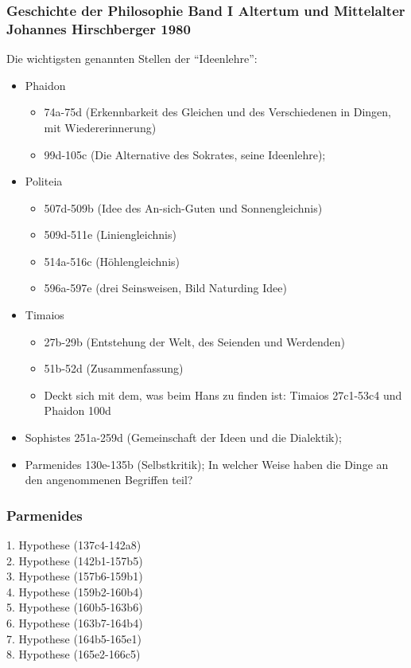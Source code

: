 \subsubsection*{Geschichte der Philosophie Band I Altertum und Mittelalter Johannes Hirschberger 1980}
Die wichtigsten genannten Stellen der \enquote{Ideenlehre}:
\begin{itemize}
    \item {Phaidon
    \begin{itemize}
        \item{74a-75d (Erkennbarkeit des Gleichen und des Verschiedenen in Dingen, mit Wiedererinnerung)}
        \item{99d-105c (Die Alternative des Sokrates, seine Ideenlehre);}
    \end{itemize}}
    \item{Politeia
        \begin{itemize}
            \item{507d-509b (Idee des An-sich-Guten und Sonnengleichnis)}
            \item{509d-511e (Liniengleichnis)}
            \item{514a-516c (Höhlengleichnis)}
            \item{596a-597e (drei Seinsweisen, Bild Naturding Idee)}
        \end{itemize}}
    \item{Timaios
    \begin{itemize}
        \item{27b-29b (Entstehung der Welt, des Seienden und Werdenden)} 
        \item{51b-52d (Zusammenfassung)} 
        \item{Deckt sich mit dem, was beim Hans zu finden ist: Timaios 27c1-53c4 und Phaidon 100d}
    \end{itemize}}
    \item{Sophistes 251a-259d (Gemeinschaft der Ideen und die Dialektik);}
    \item{Parmenides 130e-135b (Selbstkritik); In welcher Weise haben die Dinge an den angenommenen Begriffen teil?}
\end{itemize}
\subsubsection*{Parmenides}
1. Hypothese (137c4-142a8)\\
2. Hypothese (142b1-157b5)\\
3. Hypothese (157b6-159b1)\\
4. Hypothese (159b2-160b4)\\
5. Hypothese (160b5-163b6)\\
6. Hypothese (163b7-164b4)\\
7. Hypothese (164b5-165e1)\\
8. Hypothese (165e2-166c5)

